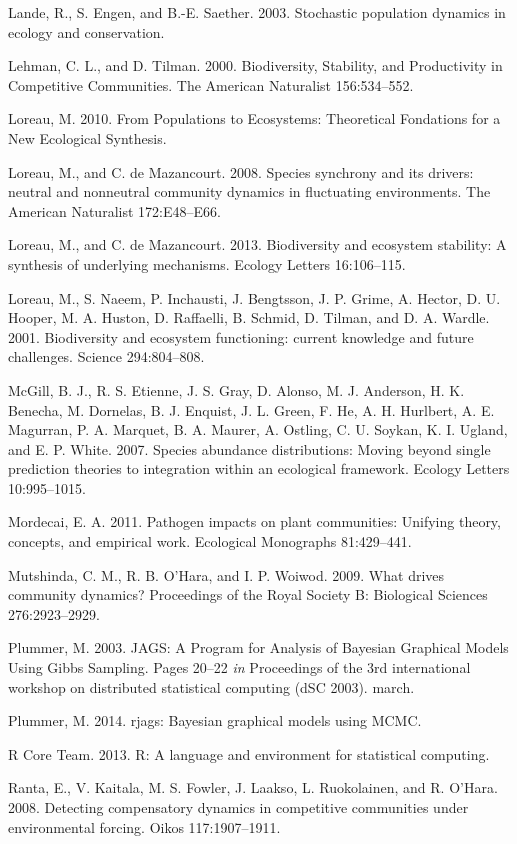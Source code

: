 \documentclass[12pt,]{article}
\begin{document}
Lande, R., S. Engen, and B.-E. Saether. 2003. Stochastic population
dynamics in ecology and conservation.

Lehman, C. L., and D. Tilman. 2000. Biodiversity, Stability, and
Productivity in Competitive Communities. The American Naturalist
156:534--552.

Loreau, M. 2010. From Populations to Ecosystems: Theoretical Fondations
for a New Ecological Synthesis.

Loreau, M., and C. {{de Mazancourt}}. 2008. Species synchrony and its
drivers: neutral and nonneutral community dynamics in fluctuating
environments. The American Naturalist 172:E48--E66.

Loreau, M., and C. {{de Mazancourt}}. 2013. Biodiversity and ecosystem
stability: A synthesis of underlying mechanisms. Ecology Letters
16:106--115.

Loreau, M., S. Naeem, P. Inchausti, J. Bengtsson, J. P. Grime, A.
Hector, D. U. Hooper, M. A. Huston, D. Raffaelli, B. Schmid, D. Tilman,
and D. A. Wardle. 2001. Biodiversity and ecosystem functioning: current
knowledge and future challenges. Science 294:804--808.

McGill, B. J., R. S. Etienne, J. S. Gray, D. Alonso, M. J. Anderson, H.
K. Benecha, M. Dornelas, B. J. Enquist, J. L. Green, F. He, A. H.
Hurlbert, A. E. Magurran, P. A. Marquet, B. A. Maurer, A. Ostling, C. U.
Soykan, K. I. Ugland, and E. P. White. 2007. Species abundance
distributions: Moving beyond single prediction theories to integration
within an ecological framework. Ecology Letters 10:995--1015.

Mordecai, E. A. 2011. Pathogen impacts on plant communities: Unifying
theory, concepts, and empirical work. Ecological Monographs 81:429--441.

Mutshinda, C. M., R. B. O'Hara, and I. P. Woiwod. 2009. What drives
community dynamics? Proceedings of the Royal Society B: Biological
Sciences 276:2923--2929.

Plummer, M. 2003. JAGS: A Program for Analysis of Bayesian Graphical
Models Using Gibbs Sampling. Pages 20--22 \emph{in} Proceedings of the
3rd international workshop on distributed statistical computing (dSC
2003). march.

Plummer, M. 2014. rjags: Bayesian graphical models using MCMC.

R Core Team. 2013. R: A language and environment for statistical
computing.

Ranta, E., V. Kaitala, M. S. Fowler, J. Laakso, L. Ruokolainen, and R.
O'Hara. 2008. Detecting compensatory dynamics in competitive communities
under environmental forcing. Oikos 117:1907--1911.
\end{document}
